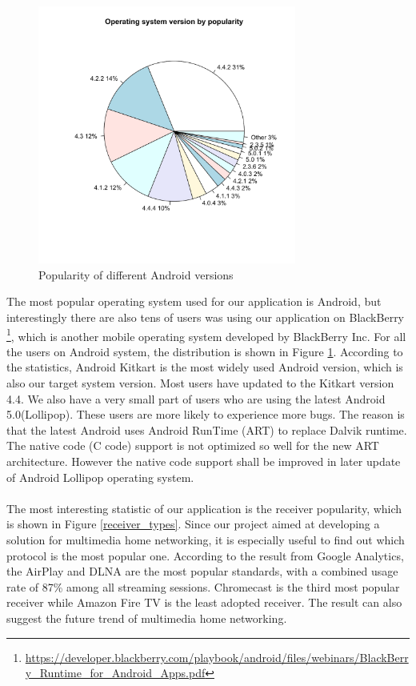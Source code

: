 \begin{figure}[!t]
\centering \includegraphics[height=8.5cm]{charts/os_version_popularity}
\caption{Popularity of different Android versions \label{os_versions}}
\end{figure}
The most popular operating system used for our application is Android, but interestingly there are also tens of users was using our application on BlackBerry \footnote{\url{https://developer.blackberry.com/playbook/android/files/webinars/BlackBerry_Runtime_for_Android_Apps.pdf}}, which is another mobile operating system developed by BlackBerry Inc.  For all the users on Android system, the distribution is shown in Figure \ref{os_versions}. According to the statistics, Android Kitkart is the most widely used Android version, which is also our target system version. Most users have updated to the Kitkart version 4.4. We also have a very small part of users who are using the latest Android 5.0(Lollipop). These users are more likely to experience more bugs. The reason is that the latest Android uses Android RunTime (ART) to replace Dalvik runtime\cite{dalvik_arch}. The native code (C code) support is not optimized so well for the new ART architecture. However the native code support shall be improved in later update of Android Lollipop operating system.\\
\\
The most interesting statistic of our application is the receiver popularity, which is shown in Figure \ref{receiver_types}. Since our project aimed at developing a solution for multimedia home networking, it is especially useful to find out which protocol is the most popular one. According to the result from Google Analytics, the AirPlay and DLNA are the most popular standards, with a combined   usage rate of 87\% among all streaming sessions. Chromecast is the third most popular receiver while Amazon Fire TV is the least adopted receiver. The result can also suggest the future trend of multimedia home networking.
